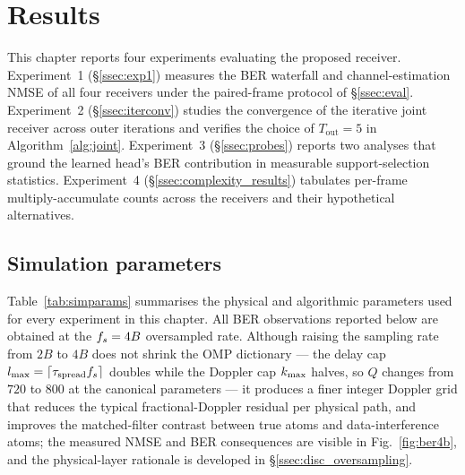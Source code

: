 \section{Results}
\label{sec:results}

This chapter reports four experiments evaluating the proposed receiver. Experiment~1 (\S\ref{ssec:exp1}) measures the BER waterfall and channel-estimation NMSE of all four receivers under the paired-frame protocol of \S\ref{ssec:eval}. Experiment~2 (\S\ref{ssec:iterconv}) studies the convergence of the iterative joint receiver across outer iterations and verifies the choice of $T_\text{out} = 5$ in Algorithm~\ref{alg:joint}. Experiment~3 (\S\ref{ssec:probes}) reports two analyses that ground the learned head's BER contribution in measurable support-selection statistics. Experiment~4 (\S\ref{ssec:complexity_results}) tabulates per-frame multiply-accumulate counts across the receivers and their hypothetical alternatives.

\subsection{Simulation parameters}
\label{ssec:simparams}

Table~\ref{tab:simparams} summarises the physical and algorithmic parameters used for every experiment in this chapter. All BER observations reported below are obtained at the $f_s = 4B$ oversampled rate. Although raising the sampling rate from $2B$ to $4B$ does not shrink the OMP dictionary --- the delay cap $l_{\max} = \lceil \tau_{\text{spread}} f_s \rceil$ doubles while the Doppler cap $k_{\max}$ halves, so $Q$ changes from $720$ to $800$ at the canonical parameters --- it produces a finer integer Doppler grid that reduces the typical fractional-Doppler residual per physical path, and improves the matched-filter contrast between true atoms and data-interference atoms; the measured NMSE and BER consequences are visible in Fig.~\ref{fig:ber4b}, and the physical-layer rationale is developed in \S\ref{ssec:disc_oversampling}.

